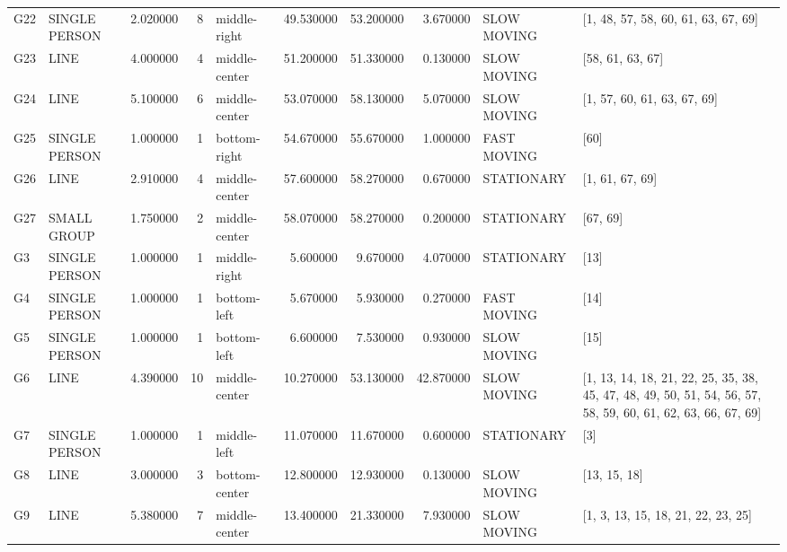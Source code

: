 \begin{table}
\begin{tabular}{llrrlrrrll}
G22 & SINGLE PERSON & 2.020000 & 8 & middle-right & 49.530000 & 53.200000 & 3.670000 & SLOW MOVING & [1, 48, 57, 58, 60, 61, 63, 67, 69] \\
G23 & LINE & 4.000000 & 4 & middle-center & 51.200000 & 51.330000 & 0.130000 & SLOW MOVING & [58, 61, 63, 67] \\
G24 & LINE & 5.100000 & 6 & middle-center & 53.070000 & 58.130000 & 5.070000 & SLOW MOVING & [1, 57, 60, 61, 63, 67, 69] \\
G25 & SINGLE PERSON & 1.000000 & 1 & bottom-right & 54.670000 & 55.670000 & 1.000000 & FAST MOVING & [60] \\
G26 & LINE & 2.910000 & 4 & middle-center & 57.600000 & 58.270000 & 0.670000 & STATIONARY & [1, 61, 67, 69] \\
G27 & SMALL GROUP & 1.750000 & 2 & middle-center & 58.070000 & 58.270000 & 0.200000 & STATIONARY & [67, 69] \\
G3 & SINGLE PERSON & 1.000000 & 1 & middle-right & 5.600000 & 9.670000 & 4.070000 & STATIONARY & [13] \\
G4 & SINGLE PERSON & 1.000000 & 1 & bottom-left & 5.670000 & 5.930000 & 0.270000 & FAST MOVING & [14] \\
G5 & SINGLE PERSON & 1.000000 & 1 & bottom-left & 6.600000 & 7.530000 & 0.930000 & SLOW MOVING & [15] \\
G6 & LINE & 4.390000 & 10 & middle-center & 10.270000 & 53.130000 & 42.870000 & SLOW MOVING & [1, 13, 14, 18, 21, 22, 25, 35, 38, 45, 47, 48, 49, 50, 51, 54, 56, 57, 58, 59, 60, 61, 62, 63, 66, 67, 69] \\
G7 & SINGLE PERSON & 1.000000 & 1 & middle-left & 11.070000 & 11.670000 & 0.600000 & STATIONARY & [3] \\
G8 & LINE & 3.000000 & 3 & bottom-center & 12.800000 & 12.930000 & 0.130000 & SLOW MOVING & [13, 15, 18] \\
G9 & LINE & 5.380000 & 7 & middle-center & 13.400000 & 21.330000 & 7.930000 & SLOW MOVING & [1, 3, 13, 15, 18, 21, 22, 23, 25] \\
\bottomrule
\end{tabular}
\end{table}
